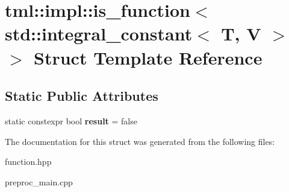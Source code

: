 \hypertarget{structtml_1_1impl_1_1is__function_3_01std_1_1integral__constant_3_01T_00_01V_01_4_01_4}{\section{tml\+:\+:impl\+:\+:is\+\_\+function$<$ std\+:\+:integral\+\_\+constant$<$ T, V $>$ $>$ Struct Template Reference}
\label{structtml_1_1impl_1_1is__function_3_01std_1_1integral__constant_3_01T_00_01V_01_4_01_4}
}
\subsection*{Static Public Attributes}
\begin{DoxyCompactItemize}
\item 
\hypertarget{structtml_1_1impl_1_1is__function_3_01std_1_1integral__constant_3_01T_00_01V_01_4_01_4_a3daeb434f055f14b1f5909ea616cc427}{static constexpr bool {\bfseries result} = false}\label{structtml_1_1impl_1_1is__function_3_01std_1_1integral__constant_3_01T_00_01V_01_4_01_4_a3daeb434f055f14b1f5909ea616cc427}

\end{DoxyCompactItemize}


The documentation for this struct was generated from the following files\+:\begin{DoxyCompactItemize}
\item 
function.\+hpp\item 
preproc\+\_\+main.\+cpp\end{DoxyCompactItemize}
